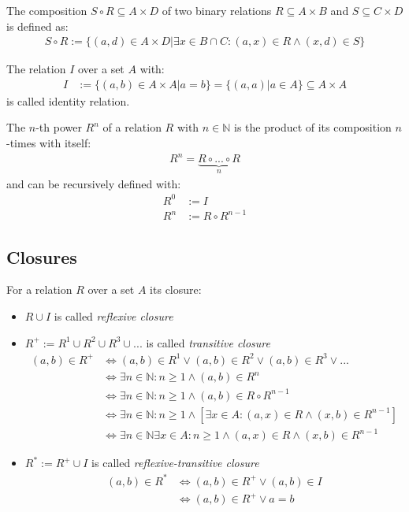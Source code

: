 \begin{definition}
The composition $S \circ R \subseteq A \times D$ of two binary relations $R \subseteq A \times B$ and $S \subseteq C \times D$ is defined as:
\begin{align}
S \circ R := \{ (a,d) \in A \times D | \exists x \in B \cap C : (a,x) \in R \wedge (x,d) \in S \}
\end{align}
\end{definition}

\begin{definition}
The relation $I$ over a set $A$ with:
\begin{align}
I &:= \{ (a,b) \in A \times A | a = b \} = \{ (a,a) | a \in A \} \subseteq A \times A
\end{align}
is called identity relation.
\end{definition}

The $n$-th power $R^n$ of a relation $R$ with $n \in \mathbb{N}$ is the product of its composition $n$-times with itself:
\begin{align}
R^n = \underbrace{R \circ ... \circ R}_{n}
\end{align}
and can be recursively defined with:
\begin{align}
R^{0} &:= I
\\R^{n} &:= R \circ R^{n-1}
\end{align}


\subsection{Closures}
For a relation $R$ over a set $A$ its closure:
\begin{itemize}
\item
$R \cup I$
is called \textit{reflexive closure}

\item
$R^{+} := R^{1} \cup R^{2} \cup R^{3} \cup ...$
is called \textit{transitive closure}
\begin{align}
(a,b) \in R^{+} 
&\Leftrightarrow 
(a,b) \in R^{1} \vee (a,b) \in R^{2} \vee (a,b) \in R^{3} \vee ...
\\&\Leftrightarrow 
\exists n \in \mathbb{N} : n \geq 1 \wedge (a,b) \in R^{n}
\\&\Leftrightarrow 
\exists n \in \mathbb{N} : n \geq 1 \wedge (a,b) \in R \circ R^{n-1}
\\&\Leftrightarrow 
\exists n \in \mathbb{N} : n \geq 1 \wedge [\exists x \in A : (a,x) \in R \wedge (x,b) \in R^{n-1} ]
\\&\Leftrightarrow 
\exists n \in \mathbb{N} \exists x \in A : n \geq 1 \wedge (a,x) \in R \wedge (x,b) \in R^{n-1}
\end{align}

\item
$R^{*} := R^{+} \cup I$
is called \textit{reflexive-transitive closure}
\begin{align}
(a,b) \in R^{*}
&\Leftrightarrow 
(a,b) \in R^{+} \vee (a,b) \in I
\\&\Leftrightarrow 
(a,b) \in R^{+} \vee a = b
\end{align}
\end{itemize}

